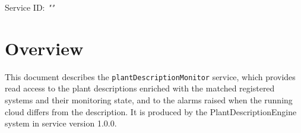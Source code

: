 \documentclass[a4paper]{arrowhead}
\begin{document}
\sloppy

\ArrowheadSetup

\begin{center}
  \vspace*{1cm}
  \huge{\arrowtitle}

  \vspace*{0.2cm}
  \LARGE{\arrowtype}
  \vspace*{1cm}

  \Large{Service ID: \textit{"\arrowid"}}

  \vspace*{\fill}


  \vspace*{1cm}
  \vspace*{\fill}

  \begin{abstract}
    This document describes the \texttt{plant\allowbreak{}Description\allowbreak{}Monitor} service, version 1.0.0, produced by the PlantDescriptionEngine support system of Arrowhead 5.2.2.
  \end{abstract}

  \vspace*{1cm}
\end{center}

\newpage

\tableofcontents
\newpage

\section{Overview}
\label{sec:overview}

This document describes the \texttt{plant\allowbreak{}Description\allowbreak{}Monitor} service, which provides read access to the plant descriptions enriched with the matched registered systems and their monitoring state, and to the alarms raised when the running cloud differs from the description.
It is produced by the PlantDescriptionEngine system \cite{pde-sysd} in service version 1.0.0.
\end{document}
